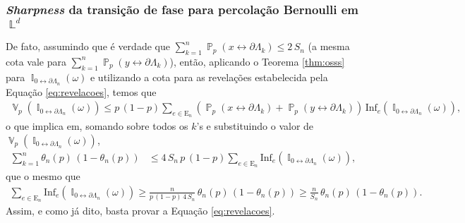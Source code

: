 \documentclass[9pt]{beamer}
\theoremstyle{definition} %
\DeclareMathOperator{\PX}{\mathbb{P}} %
\DeclareMathOperator{\VX}{\mathbb{V}} %
\DeclareMathOperator{\IX}{\mathbb{I}} %
\DeclareMathOperator{\LX}{\mathbb{L}} %
\begin{document}
	\begin{frame}[t]
		\frametitle{\textit{Sharpness} da transição de fase para percolação Bernoulli em $\LX^d$}
		De fato, assumindo que é verdade que $\sum_{k = 1}^n\PX_p(x \leftrightarrow \partial\Lambda_k) \leq 2\, S_n$ (a mesma cota vale para $\sum_{k = 1}^n\PX_p(y \leftrightarrow \partial\Lambda_k)$), então, aplicando o Teorema \ref{thm:osss} para $\IX_{0\leftrightarrow\partial\Lambda_n}(\omega)$ e utilizando a cota para as revelações estabelecida pela Equação \ref{eq:revelacoes}, temos que
		\begin{align*}
		\VX_p(\IX_{0 \leftrightarrow \partial\Lambda_n}(\omega)) \leq p\,(1-p) \sum_{e \in \text{E}_n} \left(\PX_p(x \leftrightarrow \partial\Lambda_k) + \PX_p(y \leftrightarrow \partial\Lambda_k)\right) \, \text{Inf}_e(\IX_{0 \leftrightarrow \partial\Lambda_n}(\omega)),
		\end{align*}
		o que implica em, somando sobre todos os $k$'s e substituindo o valor de $\VX_p(\IX_{0 \leftrightarrow \partial\Lambda_n}(\omega))$,
		\begin{align*}
		\sum_{k = 1}^{n} \theta_n(p)\,(1 - \theta_n(p)) &\leq 4\,S_n \, p\,(1-p) \sum_{e \in \text{E}_n} \text{Inf}_e(\IX_{0 \leftrightarrow \partial\Lambda_n}(\omega)),
		\end{align*}
		que o mesmo que
		\begin{align*}
		\sum_{e\in\text{E}_n} \text{Inf}_e(\IX_{0 \leftrightarrow \partial\Lambda_n}(\omega)) \geq \frac{n}{p\,(1-p) \, 4 \, S_n} \, \theta_n(p) \, (1 - \theta_n(p)) \geq \frac{n}{S_n} \, \theta_n(p)\, (1 - \theta_n(p)).
		\end{align*}
		Assim, e como já dito, basta provar a Equação \ref{eq:revelacoes}.
	\end{frame}
\end{document}

